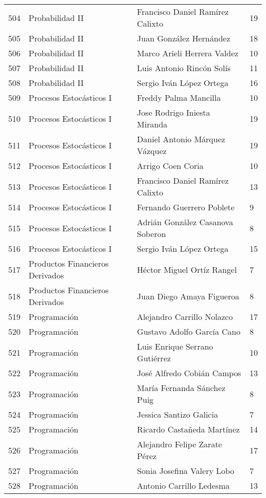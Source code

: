 \begin{table}[ht]
\begin{tabular}{rlll}
  504 & Probabilidad II & Francisco Daniel Ramírez Calixto & 19 \\ 
  505 & Probabilidad II & Juan González Hernández & 18 \\ 
  506 & Probabilidad II & Marco Arieli Herrera Valdez & 10 \\ 
  507 & Probabilidad II & Luis Antonio Rincón Solís & 11 \\ 
  508 & Probabilidad II & Sergio Iván López Ortega & 16 \\ 
  509 & Procesos Estocásticos I & Freddy Palma Mancilla & 10 \\ 
  510 & Procesos Estocásticos I & Jose Rodrigo Iniesta Miranda & 19 \\ 
  511 & Procesos Estocásticos I & Daniel Antonio Márquez Vázquez & 19 \\ 
  512 & Procesos Estocásticos I & Arrigo Coen Coria & 10 \\ 
  513 & Procesos Estocásticos I & Francisco Daniel Ramírez Calixto & 13 \\ 
  514 & Procesos Estocásticos I & Fernando Guerrero Poblete & 9 \\ 
  515 & Procesos Estocásticos I & Adrián González Casanova Soberon & 8 \\ 
  516 & Procesos Estocásticos I & Sergio Iván López Ortega & 15 \\ 
  517 & Productos Financieros Derivados & Héctor Miguel Ortíz Rangel & 7 \\ 
  518 & Productos Financieros Derivados & Juan Diego Amaya Figueroa & 8 \\ 
  519 & Programación & Alejandro Carrillo Nolazco & 17 \\ 
  520 & Programación & Gustavo Adolfo García Cano & 8 \\ 
  521 & Programación & Luis Enrique Serrano Gutiérrez & 10 \\ 
  522 & Programación & José Alfredo Cobián Campos & 13 \\ 
  523 & Programación & María Fernanda Sánchez Puig & 8 \\ 
  524 & Programación & Jessica Santizo Galicia & 7 \\ 
  525 & Programación & Ricardo Castañeda Martínez & 14 \\ 
  526 & Programación & Alejandro Felipe Zarate Pérez & 17 \\ 
  527 & Programación & Sonia Josefina Valery Lobo & 7 \\ 
  528 & Programación & Antonio Carrillo Ledesma & 13 \\ 

\end{tabular}
\end{table}
